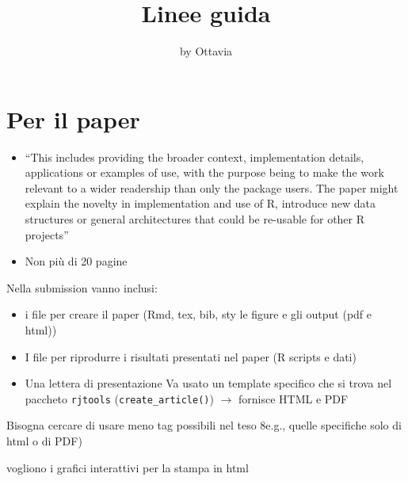\title{Linee guida}
\author{by Ottavia}

\maketitle


\hypertarget{per-il-paper}{%
\section{Per il paper}\label{per-il-paper}}

\begin{itemize}
\item
  ``This includes providing the broader context, implementation details,
  applications or examples of use, with the purpose being to make the
  work relevant to a wider readership than only the package users. The
  paper might explain the novelty in implementation and use of R,
  introduce new data structures or general architectures that could be
  re-usable for other R projects''
\item
  Non più di 20 pagine
\end{itemize}

Nella submission vanno inclusi:

\begin{itemize}
\item
  i file per creare il paper (Rmd, tex, bib, sty le figure e gli output
  (pdf e html))
\item
  I file per riprodurre i risultati presentati nel paper (R scripts e
  dati)
\item
  Una lettera di presentazione Va usato un template specifico che si
  trova nel paccheto \texttt{rjtools} (\texttt{create\_article()})
  \(\rightarrow\) fornisce HTML e PDF
\end{itemize}

Bisogna cercare di usare meno tag possibili nel teso 8e.g., quelle
specifiche solo di html o di PDF)

vogliono i grafici interattivi per la stampa in html


\address{%
Ottavia\\
Unipd\\%
\\
%
%
%
%
}
